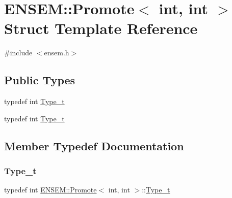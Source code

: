 \hypertarget{structENSEM_1_1Promote_3_01int_00_01int_01_4}{}\section{E\+N\+S\+EM\+:\+:Promote$<$ int, int $>$ Struct Template Reference}
\label{structENSEM_1_1Promote_3_01int_00_01int_01_4}


{\ttfamily \#include $<$ensem.\+h$>$}

\subsection*{Public Types}
\begin{DoxyCompactItemize}
\item 
typedef int \mbox{\hyperlink{structENSEM_1_1Promote_3_01int_00_01int_01_4_ad314c2e73c9d5431718e02d851a4322b}{Type\+\_\+t}}
\item 
typedef int \mbox{\hyperlink{structENSEM_1_1Promote_3_01int_00_01int_01_4_ad314c2e73c9d5431718e02d851a4322b}{Type\+\_\+t}}
\end{DoxyCompactItemize}


\subsection{Member Typedef Documentation}
\mbox{\label{structENSEM_1_1Promote_3_01int_00_01int_01_4_ad314c2e73c9d5431718e02d851a4322b}} 
\subsubsection{\texorpdfstring{Type\_t}{Type\_t}\hspace{0.1cm}{\footnotesize\ttfamily [1/2]}}
{\footnotesize\ttfamily typedef int \mbox{\hyperlink{structENSEM_1_1Promote}{E\+N\+S\+E\+M\+::\+Promote}}$<$ int, int $>$\+::\mbox{\hyperlink{structENSEM_1_1Promote_3_01int_00_01int_01_4_ad314c2e73c9d5431718e02d851a4322b}{Type\+\_\+t}}}

\mbox{\label{structENSEM_1_1Promote_3_01int_00_01int_01_4_ad314c2e73c9d5431718e02d851a4322b}} 
